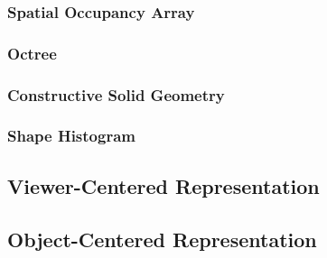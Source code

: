 \documentclass{article}
\begin{document}
\begin{multicols}{2}
\subsubsection{Spatial Occupancy Array}
\subsubsection{Octree}
\subsubsection{Constructive Solid Geometry}
\subsubsection{Shape Histogram}
\subsection{Viewer-Centered Representation}
\subsection{Object-Centered Representation}

\end{multicols}
\end{document}
